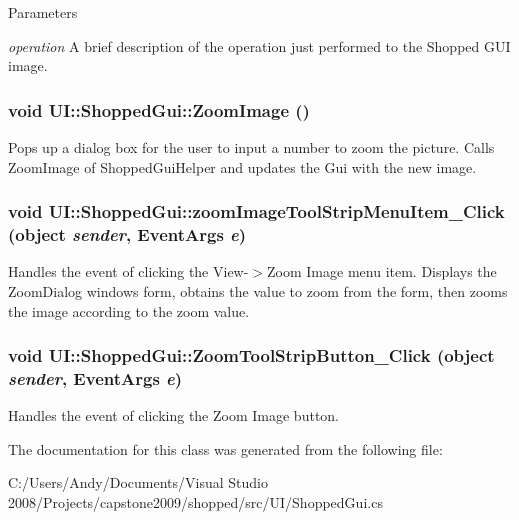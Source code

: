 \begin{DoxyParams}{Parameters}
\item[{\em operation}]A brief description of the operation just performed to the Shopped GUI image. \end{DoxyParams}
\hypertarget{class_u_i_1_1_shopped_gui_a12f67f7b5543dec9779eaac2f8948111}{
\subsubsection[{ZoomImage}]{\setlength{\rightskip}{0pt plus 5cm}void UI::ShoppedGui::ZoomImage ()}}
\label{class_u_i_1_1_shopped_gui_a12f67f7b5543dec9779eaac2f8948111}
Pops up a dialog box for the user to input a number to zoom the picture. Calls ZoomImage of ShoppedGuiHelper and updates the Gui with the new image. \hypertarget{class_u_i_1_1_shopped_gui_a5f99b03c74d01734153873d6c35fbdf3}{
\subsubsection[{zoomImageToolStripMenuItem\_\-Click}]{\setlength{\rightskip}{0pt plus 5cm}void UI::ShoppedGui::zoomImageToolStripMenuItem\_\-Click (object {\em sender}, \/  EventArgs {\em e})}}
\label{class_u_i_1_1_shopped_gui_a5f99b03c74d01734153873d6c35fbdf3}
Handles the event of clicking the View-\/$>$Zoom Image menu item. Displays the ZoomDialog windows form, obtains the value to zoom from the form, then zooms the image according to the zoom value. \hypertarget{class_u_i_1_1_shopped_gui_adae47cccd54dffb1caba9b7226e93fd1}{
\subsubsection[{ZoomToolStripButton\_\-Click}]{\setlength{\rightskip}{0pt plus 5cm}void UI::ShoppedGui::ZoomToolStripButton\_\-Click (object {\em sender}, \/  EventArgs {\em e})}}
\label{class_u_i_1_1_shopped_gui_adae47cccd54dffb1caba9b7226e93fd1}
Handles the event of clicking the Zoom Image button. 

The documentation for this class was generated from the following file:\begin{DoxyCompactItemize}
\item 
C:/Users/Andy/Documents/Visual Studio 2008/Projects/capstone2009/shopped/src/UI/ShoppedGui.cs\end{DoxyCompactItemize}
